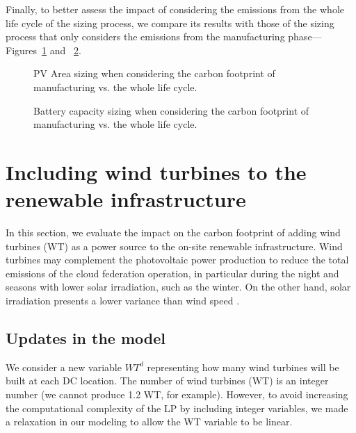 Finally, to better assess the impact of considering the emissions from the whole life cycle of the sizing process, we compare its results with those of the sizing process that only considers the emissions from the manufacturing phase---Figures~\ref{fig:pv_lca} and ~\ref{fig:bat_lca}.


\begin{figure}[h]
  \centering
  {}
  \caption{PV Area sizing when considering the carbon footprint of manufacturing vs. the whole life cycle. }
  \label{fig:pv_lca}
\end{figure}


\begin{figure}[h]
  \centering
  {}
  \caption{Battery capacity sizing when considering the carbon footprint of manufacturing vs. the whole life cycle.  }
  \label{fig:bat_lca}
\end{figure}



\section{Including wind turbines to the renewable infrastructure}
\label{sec:add_wt}


In this section, we evaluate the impact on the carbon footprint of adding wind turbines (WT) as a power source to the on-site renewable infrastructure. Wind turbines may complement the photovoltaic power production to reduce the total emissions of the cloud federation operation, in particular during the night and seasons with lower solar irradiation, such as the winter. On the other hand, solar irradiation presents a lower variance than wind speed \cite{krakauer2017prediction_accuracy}.

\subsection{Updates in the model}
\label{sec:ex_model_wt}

We consider a new variable $WT^d$ representing how many wind turbines will be built at each DC location. The number of wind turbines (WT) is an integer number (we cannot produce 1.2 WT, for example). However, to avoid increasing the computational complexity of the LP by including integer variables, we made a relaxation in our modeling to allow the WT variable to be linear. 

